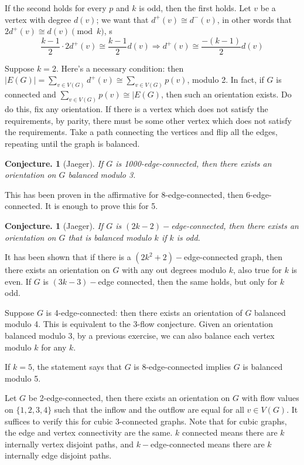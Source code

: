 \documentclass[11pt, a4paper]{memoir}
\theoremstyle{change}
\newtheorem{conjecture}[theorem]{Conjecture.}
\theoremstyle{plain}
\theoremstyle{nonumberplain}
\numberwithin{equation}{section}
\begin{document}
If the second holds for every $p$ and $k$ is odd, then the first holds.
Let $v$ be a vertex with degree $d(v)$; we want that $d^+(v)\cong d^-(v)$, in other words that $2d^+(v)\cong d(v)\pmod{k}$, s
\begin{equation*}
    \frac{k-1}{2}\cdot 2d^+(v)\cong\frac{k-1}{2} d(v)\Rightarrow d^+(v)\cong\frac{-(k-1)}{2} d(v)
\end{equation*}

Suppose $k=2$.
Here's a necessary condition: then $|E(G)|=\sum_{v\in V(G)}d^+(v)\cong\sum_{v\in V(G)}p(v)$, modulo 2.
In fact, if $G$ is connected and $\sum_{v\in V(G)}p(v)\cong|E(G)$, then such an orientation exists.
Do do this, fix any orientation.
If there is a vertex which does not satisfy the requirements, by parity, there must be some other vertex which does not satisfy the requirements.
Take a path connecting the vertices and flip all the edges, repeating until the graph is balanced.
\begin{conjecture}[Jaeger]
    If $G$ is 1000-edge-connected, then there exists an orientation on $G$ balanced modulo 3.
\end{conjecture}
This has been proven in the affirmative for 8-edge-connected, then 6-edge-connected.
It is enough to prove this for 5.
\begin{conjecture}[Jaeger]
    If $G$ is $(2k-2)-$edge-connected, then there exists an orientation on $G$ that is balanced modulo $k$ if $k$ is odd.
\end{conjecture}
It has been shown that if there is a $(2k^2+2)-$edge-connected graph, then there exists an orientation on $G$ with any out degrees modulo $k$, also true for $k$ is even.
If $G$ is $(3k-3)-$edge connected, then the same holds, but only for $k$ odd.

Suppose $G$ is 4-edge-connected: then there exists an orientation of $G$ balanced modulo 4.
This is equivalent to the 3-flow conjecture.
Given an orientation balanced modulo 3, by a previous exercise, we can also balance each vertex modulo $k$ for any $k$.

If $k=5$, the statement says that $G$ is 8-edge-connected implies $G$ is balanced modulo 5.

Let $G$ be 2-edge-connected, then there exists an orientation on $G$ with flow values on $\{1,2,3,4\}$ such that the inflow and the outflow are equal for all $v\in V(G)$.
It suffices to verify this for cubic 3-connected graphs.
Note that for cubic graphs, the edge and vertex connectivity are the same.
$k$ connected means there are $k$ internally vertex disjoint paths, and $k-$edge-connected means there are $k$ internally edge disjoint paths.
\end{document}
